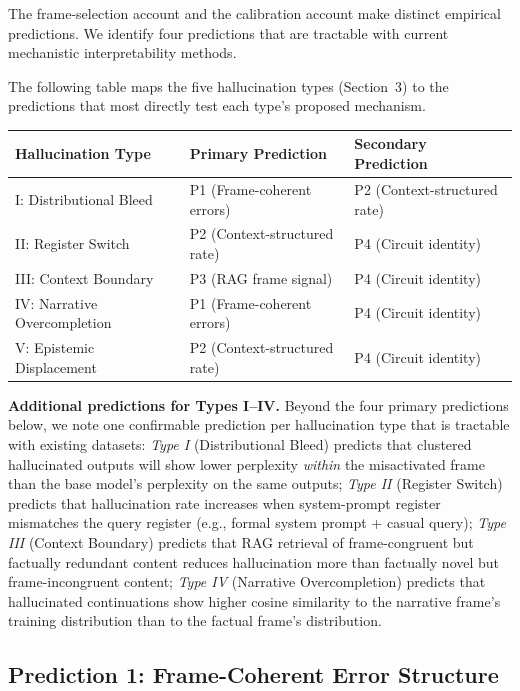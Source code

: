 \documentclass[12pt]{article}
\begin{document}
The frame-selection account and the calibration account make
distinct empirical predictions. We identify four predictions
that are tractable with current mechanistic interpretability methods.

The following table maps the five hallucination types (Section~3)
to the predictions that most directly test each type's proposed
mechanism.

\begin{center}
\small
\begin{tabular}{lll}
\toprule
Hallucination Type & Primary Prediction & Secondary Prediction \\
\midrule
I: Distributional Bleed & P1 (Frame-coherent errors) & P2 (Context-structured rate) \\
II: Register Switch & P2 (Context-structured rate) & P4 (Circuit identity) \\
III: Context Boundary & P3 (RAG frame signal) & P4 (Circuit identity) \\
IV: Narrative Overcompletion & P1 (Frame-coherent errors) & P4 (Circuit identity) \\
V: Epistemic Displacement & P2 (Context-structured rate) & P4 (Circuit identity) \\
\bottomrule
\end{tabular}
\end{center}

\medskip

\noindent\textbf{Additional predictions for Types I--IV.}
Beyond the four primary predictions below, we note one
confirmable prediction per hallucination type that is tractable
with existing datasets:
\textit{Type I} (Distributional Bleed) predicts that clustered
hallucinated outputs will show lower perplexity \emph{within}
the misactivated frame than the base model's perplexity on the same outputs;
\textit{Type II} (Register Switch) predicts that hallucination rate
increases when system-prompt register mismatches the query register
(e.g., formal system prompt + casual query);
\textit{Type III} (Context Boundary) predicts that RAG retrieval
of frame-congruent but factually redundant content reduces hallucination
more than factually novel but frame-incongruent content;
\textit{Type IV} (Narrative Overcompletion) predicts that hallucinated
continuations show higher cosine similarity to the narrative frame's
training distribution than to the factual frame's distribution.

\subsection{Prediction 1: Frame-Coherent Error Structure}
\end{document}
